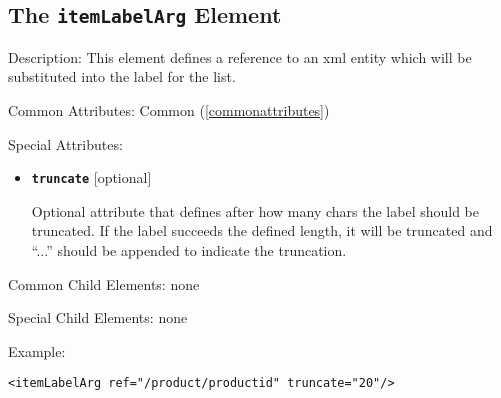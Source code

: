 \subsection{ The \texttt{itemLabelArg} Element}
\label{itemLabelArg}
\begin{description}
 \item Description: This element defines a reference to an xml entity which will be substituted into the label for the list.

 \item Common Attributes: Common (\ref{commonattributes})

 \item Special Attributes:

\begin{itemize}
 \item \textbf{\texttt{truncate}} [optional]

Optional attribute that defines after how many chars the label should be truncated. If the label succeeds the defined length, it will be truncated and ``...'' should be appended to indicate the truncation.
\end{itemize}

 \item Common Child Elements: none

 \item Special Child Elements: none

 \item Example: 

\begin{lstlisting}[caption=\texttt{itemLabelArg} Element]
<itemLabelArg ref="/product/productid" truncate="20"/>
\end{lstlisting}
\end{description}





